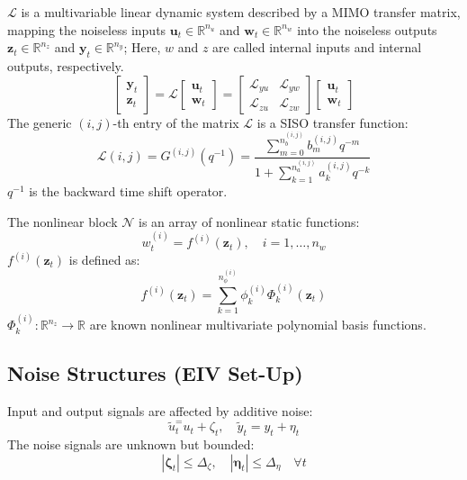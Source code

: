 $\mathcal{L}$ is a multivariable linear dynamic system described by a MIMO transfer matrix, mapping the noiseless inputs $\mathbf{u}_t \in \mathbb{R}^{n_u}$ and $\mathbf{w}_t \in \mathbb{R}^{n_w}$ into the noiseless outputs $\mathbf{z}_t \in \mathbb{R}^{n_z}$ and $\mathbf{y}_t \in \mathbb{R}^{n_y}$; Here, $w$ and $z$ are called internal inputs and internal outputs, respectively.
    \[
    \begin{bmatrix}
    \mathbf{y}_t \\
    \mathbf{z}_t
    \end{bmatrix}
    = \mathcal{L}
    \begin{bmatrix}
    \mathbf{u}_t \\
    \mathbf{w}_t
    \end{bmatrix}
    =
    \begin{bmatrix}
    \mathcal{L}_{yu} & \mathcal{L}_{yw} \\
    \mathcal{L}_{zu} & \mathcal{L}_{zw}
    \end{bmatrix}
    \begin{bmatrix}
    \mathbf{u}_t \\
    \mathbf{w}_t
    \end{bmatrix}
    \]
The generic $(i,j)$-th entry of the matrix $\mathcal{L}$ is a SISO transfer function:
    \[
    \mathcal{L}(i,j) = G^{(i,j)}(q^{-1}) = \frac{\sum_{m=0}^{n_b^{(i,j)}} b_m^{(i,j)} q^{-m}}{1 + \sum_{k=1}^{n_a^{(i,j)}} a_k^{(i,j)} q^{-k}}
    \]
$q^{-1}$ is the backward time shift operator.

The nonlinear block $\mathcal{N}$ is an array of nonlinear static functions:
    \[
w_t^{(i)} = f^{(i)}(\mathbf{z}_t), \quad i = 1, \dots, n_w
    \]
$f^{(i)}(\mathbf{z}_t)$ is defined as:
    \[
    f^{(i)}(\mathbf{z}_t) = \sum_{k=1}^{n_\phi^{(i)}} \phi_k^{(i)} \Phi_k^{(i)}(\mathbf{z}_t)
    \]
$\Phi_k^{(i)}: \mathbb{R}^{n_z} \to \mathbb{R}$ are known nonlinear multivariate polynomial basis functions.


\subsection{Noise Structures (EIV Set-Up)}

Input and output signals are affected by additive noise:
    \[
    \tilde{u}_t^ = u_t + \zeta_t, \quad \tilde{y}_t = y_t + \eta_t
    \]
  The noise signals are unknown but bounded:
    \[
    |\boldsymbol{\zeta}_t| \leq \Delta_{\zeta}, \quad |\boldsymbol{\eta}_t| \leq \Delta_{\eta} \quad \forall t
    \]

